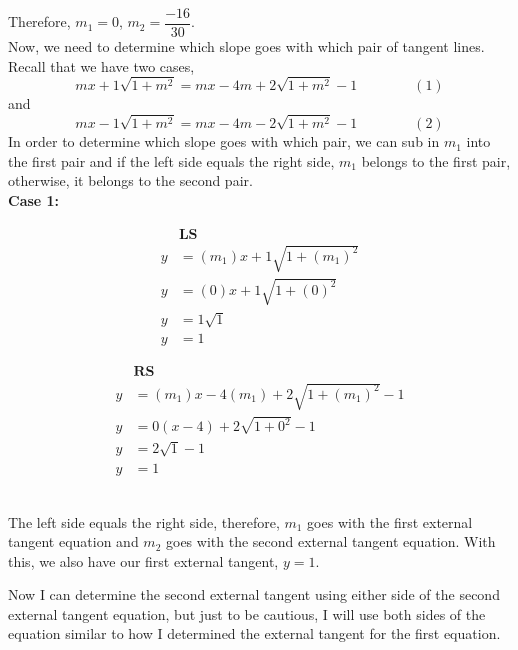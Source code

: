 \documentclass[12pt]{book}
\begin{document}
\begin{enumerate}
Therefore, $m_1 = 0$, $m_2 = \dfrac{-16}{30}$. \\

Now, we need to determine which slope goes with which pair of tangent lines. Recall that we have two cases,
$$mx + 1\sqrt{1+m^2} = mx-4m + 2\sqrt{1+m^2}-1 \qquad\qquad (1)$$
and
$$mx - 1\sqrt{1+m^2} = mx-4m - 2\sqrt{1+m^2}-1 \qquad\qquad (2)$$ 
In order to determine which slope goes with which pair, we can sub in $m_1$ into the first pair and if the left side equals the right side, $m_1$ belongs to the first pair, otherwise, it belongs to the second pair.\\

\textbf{Case 1:}\\
\begin{minipage}{0.5\textwidth}
    \begin{align*}
    &\textbf{LS}\\
        y &= (m_1)x + 1\sqrt{1+(m_1)^2} \\
        y &= (0)x + 1\sqrt{1+(0)^2} \\
        y &= 1\sqrt{1} \\
        y &= 1
    \end{align*}
\end{minipage}
\begin{minipage}{0.5\textwidth}
    \begin{align*}
    &\textbf{RS}\\
        y &= (m_1)x-4(m_1) + 2\sqrt{1+(m_1)^2}-1 \\
        y &= 0(x-4) + 2\sqrt{1+0^2} - 1\\
        y &= 2\sqrt{1} - 1\\
        y &= 1
    \end{align*}
\end{minipage}\\

The left side equals the right side, therefore, $m_1$ goes with the first external tangent equation and $m_2$ goes with the second external tangent equation. With this, we also have our first external tangent, $y=1$.

\newpage

Now I can determine the second external tangent using either side of the second external tangent equation, but just to be cautious, I will use both sides of the equation similar to how I determined the external tangent for the first equation.\\


\end{enumerate}
\end{document}
